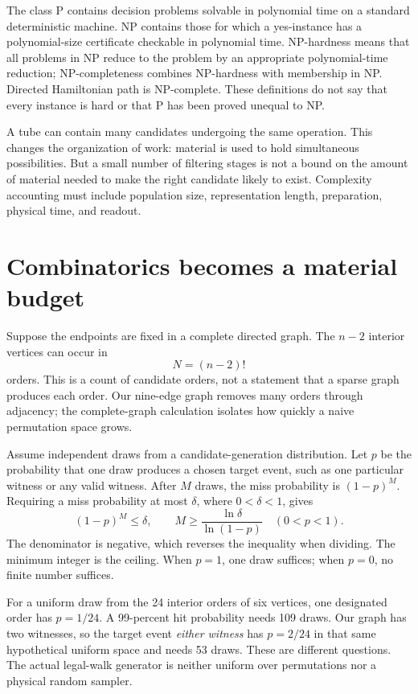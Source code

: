 The class P contains decision problems solvable in polynomial time on a standard deterministic machine. NP contains those for which a yes-instance has a polynomial-size certificate checkable in polynomial time. NP-hardness means that all problems in NP reduce to the problem by an appropriate polynomial-time reduction; NP-completeness combines NP-hardness with membership in NP. Directed Hamiltonian path is NP-complete.\cite{hamilton} These definitions do not say that every instance is hard or that P has been proved unequal to NP.

A tube can contain many candidates undergoing the same operation. This changes the organization of work: material is used to hold simultaneous possibilities. But a small number of filtering stages is not a bound on the amount of material needed to make the right candidate likely to exist. Complexity accounting must include population size, representation length, preparation, physical time, and readout.

\section{Combinatorics becomes a material budget}\label{sec:scaling}
Suppose the endpoints are fixed in a complete directed graph. The $n-2$ interior vertices can occur in
\[
 N=(n-2)!
\]
orders. This is a count of candidate orders, not a statement that a sparse graph produces each order. Our nine-edge graph removes many orders through adjacency; the complete-graph calculation isolates how quickly a naive permutation space grows.
\begin{center}\end{center}

Assume independent draws from a candidate-generation distribution. Let $p$ be the probability that one draw produces a chosen target event, such as one particular witness or any valid witness. After $M$ draws, the miss probability is $(1-p)^M$. Requiring a miss probability at most $\delta$, where $0<\delta<1$, gives
\[
 (1-p)^M\le\delta,\qquad
 M\ge\frac{\ln\delta}{\ln(1-p)}\quad(0<p<1).
\]
The denominator is negative, which reverses the inequality when dividing. The minimum integer is the ceiling. When $p=1$, one draw suffices; when $p=0$, no finite number suffices.

For a uniform draw from the 24 interior orders of six vertices, one designated order has $p=1/24$. A 99-percent hit probability needs 109 draws. Our graph has two witnesses, so the target event \emph{either witness} has $p=2/24$ in that same hypothetical uniform space and needs 53 draws. These are different questions. The actual legal-walk generator is neither uniform over permutations nor a physical random sampler.

